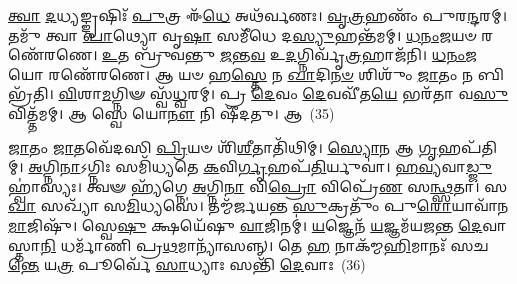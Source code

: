 \-\ul{𑌤𑍍𑌵𑌾} \ul{𑌦}\-𑌧𑍍𑌯𑌙𑍍𑌙𑍃𑌷𑌿𑌃᳴ \ul{𑌪𑍁}\-𑌤𑍍𑌰 𑌈᳴\-\ul{𑌧𑍇} 𑌅𑌥᳴𑌰𑍍𑌵𑌣𑌃। \ul{𑌵𑍃}\-\-\ul{𑌤𑍍𑌰}\-𑌹𑌣𑌂᳴ 𑌪𑍁𑌰\-\ul{𑌨𑍍𑌦}\-𑌰𑌮𑍍। 𑌤𑌮𑍁᳴ 𑌤𑍍𑌵𑌾 \ul{𑌪𑌾}\-𑌥𑍍𑌯𑍋 𑌵𑍃\-\ul{𑌷𑌾} 𑌸𑌮𑍀᳴𑌧𑍇 𑌦\-\ul{𑌸𑍍𑌯𑍁}\-𑌹𑌨𑍍𑌤᳴𑌮𑌮𑍍। \ul{𑌧}\-\-\ul{𑌨𑌂}\-\-\ul{𑌜}\-𑌯𑍞 𑌰𑌣𑍇᳴𑌰𑌣𑍇। \ul{𑌉}\-𑌤 𑌬𑍍𑌰𑍁᳴𑌵𑌨𑍍𑌤𑍁 \ul{𑌜}\-𑌨𑍍𑌤\-\ul{𑌵} 𑌉\-\ul{𑌦}\-𑌗𑍍𑌨𑌿𑌰𑍍𑌵𑍃᳴\-\ul{𑌤𑍍𑌰}\-𑌹𑌾𑌜᳴𑌨𑌿। \ul{𑌧}\-\-\ul{𑌨𑌂}\-\-\ul{𑌜}\-𑌯𑍋 𑌰𑌣𑍇᳴𑌰𑌣𑍇। 𑌆 𑌯𑍞 𑌹\-\ul{𑌸𑍍𑌤𑍇} 𑌨 \ul{𑌖𑌾}\-𑌦𑌿\-\ul{𑌨}\-\-\ul{𑍞} 𑌶𑌿𑌶𑍁𑌂᳴ \ul{𑌜𑌾}\-𑌤𑌂 𑌨 𑌬𑌿𑌭𑍍𑌰᳴𑌤𑌿। \ul{𑌵𑌿}\-𑌶𑌾\-\ul{𑌮}\-𑌗𑍍𑌨𑌿𑍟 𑌸𑍍𑌵᳴\-\ul{𑌧𑍍𑌵}\-𑌰𑌮𑍍। 𑌪𑍍𑌰 \ul{𑌦𑍇}\-𑌵𑌂 \ul{𑌦𑍇}\-𑌵𑌵𑍀᳴𑌤\-\ul{𑌯𑍇} 𑌭𑌰᳴𑌤𑌾 𑌵\-\ul{𑌸𑍁}\-𑌵𑌿𑌤𑍍𑌤᳴𑌮𑌮𑍍। 𑌆 𑌸𑍍𑌵𑍇 𑌯𑍋\-\ul{𑌨𑍗} 𑌨𑌿 𑌷𑍀᳴𑌦𑌤𑍁। 𑌆~(35)


\-\ul{𑌜𑌾}\-𑌤𑌂 \ul{𑌜𑌾}\-𑌤𑌵𑍇᳴𑌦𑌸𑌿 \ul{𑌪𑍍𑌰𑌿}\-𑌯𑍞 𑌶𑌿᳴\-\ul{𑌶𑍀}\-𑌤𑌾𑌤𑌿᳴𑌥𑌿𑌮𑍍। \ul{𑌸𑍍𑌯𑍋}\-𑌨 𑌆 \ul{𑌗𑍃}\-𑌹𑌪᳴𑌤𑌿𑌮𑍍। \ul{𑌅}\-𑌗𑍍𑌨𑌿\-\ul{𑌨𑌾}\-𑌽𑌗𑍍𑌨𑌿𑌃 𑌸𑌮𑌿᳴𑌧𑍍𑌯𑌤𑍇 \ul{𑌕}\-𑌵𑌿\-\ul{𑌰𑍍𑌗𑍃}\-𑌹𑌪᳴\-\ul{𑌤𑌿}\-𑌰𑍍𑌯𑍁𑌵𑌾॑। \ul{𑌹}\-\-\ul{𑌵𑍍𑌯}\-𑌵𑌾\-\ul{𑌡𑍍𑌜𑍁}\-𑌹𑍍𑌵𑌾॑𑌸𑍍𑌯𑌃। 𑌤𑍍𑌵𑍟 𑌹𑍍𑌯᳴𑌗𑍍𑌨𑍇 \ul{𑌅}\-𑌗𑍍𑌨𑌿\-\ul{𑌨𑌾} 𑌵𑌿\-\ul{𑌪𑍍𑌰𑍋} 𑌵𑌿𑌪𑍍𑌰𑍇᳴\-\ul{𑌣} 𑌸\-\ul{𑌨𑍍𑌥𑍍𑌸}\-𑌤𑌾। 𑌸\-\ul{𑌖𑌾} 𑌸𑌖𑍍𑌯𑌾᳴ 𑌸\-\ul{𑌮𑌿}\-𑌧𑍍𑌯𑌸𑍇॑। 𑌤𑌮𑍍𑌮᳴𑌰𑍍𑌜𑌯𑌨𑍍𑌤 \ul{𑌸𑍁}\-𑌕𑍍𑌰𑌤𑍁𑌂᳴ 𑌪𑍁\-\ul{𑌰𑍋}\-𑌯𑌾𑌵𑌾᳴𑌨\-\ul{𑌮𑌾}\-𑌜𑌿𑌷𑍁᳴। 𑌸𑍍𑌵𑍇\-\ul{𑌷𑍁} 𑌕𑍍𑌷𑌯𑍇᳴𑌷𑍁 \ul{𑌵𑌾}\-𑌜𑌿𑌨𑌮𑍍॑। \ul{𑌯}\-𑌜𑍍𑌞𑍇𑌨᳴ \ul{𑌯}\-𑌜𑍍𑌞𑌮᳴𑌯𑌜𑌨𑍍𑌤 \ul{𑌦𑍇}\-𑌵𑌾𑌸𑍍𑌤𑌾\-\ul{𑌨𑌿} 𑌧𑌰𑍍𑌮𑌾᳴𑌣𑌿 𑌪𑍍𑌰\-\ul{𑌥}\-𑌮𑌾𑌨𑍍𑌯𑌾᳴𑌸𑌨𑍍𑌨𑍍। 𑌤𑍇 \ul{𑌹} 𑌨𑌾𑌕᳴𑌮𑍍𑌮\-\ul{𑌹𑌿}\-𑌮𑌾𑌨𑌃᳴ 𑌸𑌚\-\ul{𑌨𑍍𑌤𑍇} 𑌯\-\ul{𑌤𑍍𑌰} 𑌪𑍂𑌰𑍍𑌵𑍇᳴ \ul{𑌸𑌾}\-𑌧𑍍𑌯𑌾𑌃 𑌸𑌨𑍍𑌤𑌿᳴ \ul{𑌦𑍇}\-𑌵𑌾𑌃~(36)


{\anuvakamend[{𑌵𑍋𑌢᳴𑌵𑍇 \ul{𑌦𑍂}\-𑌤𑌸𑍍𑌤𑍍𑌵𑌨𑍍𑌤𑌮𑍁᳴ 𑌸𑍀\-\ul{𑌦}\-𑌤𑍍𑌵𑌾 𑌯𑌤𑍍𑌰᳴ \ul{𑌚}\-𑌤𑍍𑌵𑌾𑌰𑌿᳴ 𑌚}]}%

{}
